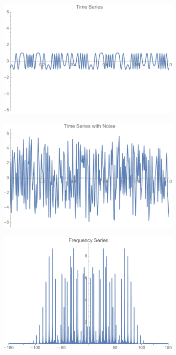 \documentclass[onecolumn, groupedaddress, 10pt]{revtex4-1}
\begin{document}
\begin{figure}[t]
	\centering
	\begin{subfigure}{.5\textwidth}
  		\centering
  		\includegraphics[width=.9\linewidth]{timeSeries.pdf}
  		\caption{}
	\end{subfigure}%
	\begin{subfigure}{.5\textwidth}
  		\centering
  		\includegraphics[width=.9\linewidth]{timeSeriesNoise.pdf}
  		\caption{}
	\end{subfigure}
	\begin{subfigure}{.5\textwidth}
  		\centering
  		\includegraphics[width=.9\linewidth]{fourierSeries.pdf}

\end{subfigure}
\end{figure}
\end{document}

